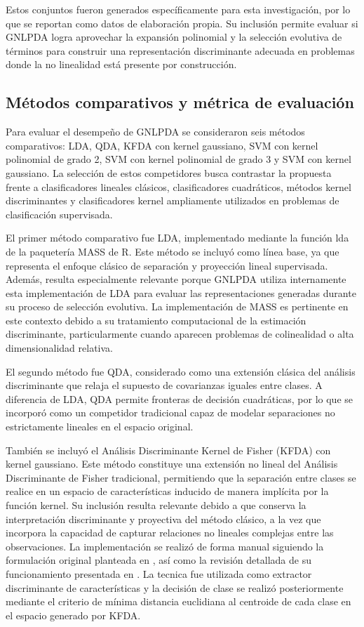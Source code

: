 Estos conjuntos fueron generados específicamente para esta investigación, por lo que se reportan como datos de elaboración propia. Su inclusión permite evaluar si GNLPDA logra aprovechar la expansión polinomial y la selección evolutiva de términos para construir una representación discriminante adecuada en problemas donde la no linealidad está presente por construcción.

\subsection{Métodos comparativos y métrica de evaluación}

Para evaluar el desempeño de GNLPDA se consideraron seis métodos comparativos: LDA, QDA, KFDA con kernel gaussiano, SVM con kernel polinomial de grado 2, SVM con kernel polinomial de grado 3 y SVM con kernel gaussiano. La selección de estos competidores busca contrastar la propuesta frente a clasificadores lineales clásicos, clasificadores cuadráticos, métodos kernel discriminantes y clasificadores kernel ampliamente utilizados en problemas de clasificación supervisada.

El primer método comparativo fue LDA, implementado mediante la función lda de la paquetería MASS de R. Este método se incluyó como línea base, ya que representa el enfoque clásico de separación y proyección lineal supervisada. Además, resulta especialmente relevante porque GNLPDA utiliza internamente esta implementación de LDA para evaluar las representaciones generadas durante su proceso de selección evolutiva. La implementación de MASS es pertinente en este contexto debido a su tratamiento computacional de la estimación discriminante, particularmente cuando aparecen problemas de colinealidad o alta dimensionalidad relativa.

El segundo método fue QDA, considerado como una extensión clásica del análisis discriminante que relaja el supuesto de covarianzas iguales entre clases. A diferencia de LDA, QDA permite fronteras de decisión cuadráticas, por lo que se incorporó como un competidor tradicional capaz de modelar separaciones no estrictamente lineales en el espacio original.

También se incluyó el Análisis Discriminante Kernel de Fisher (KFDA) con kernel gaussiano. Este método constituye una extensión no lineal del Análisis Discriminante de Fisher tradicional, permitiendo que la separación entre clases se realice en un espacio de características inducido de manera implícita por la función kernel. Su inclusión resulta relevante debido a que conserva la interpretación discriminante y proyectiva del método clásico, a la vez que incorpora la capacidad de capturar relaciones no lineales complejas entre las observaciones. La implementación se realizó de forma manual siguiendo la formulación original planteada en \cite{mika1999fisher}, así como la revisión detallada de su funcionamiento presentada en \cite{ghojogh2019fisher}.
La tecnica fue utilizada como extractor discriminante de características y la decisión de clase se realizó posteriormente mediante el criterio de mínima distancia euclidiana al centroide de cada clase en el espacio generado por KFDA.


